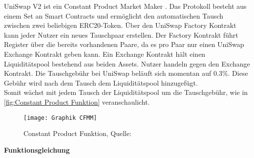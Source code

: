 \documentclass[12pt,a4paper,titlepage,oneside,english]{article}
\begin{document}
UniSwap V2 ist ein Constant Product Market Maker \citep{Berenzon2020}. Das Protokoll besteht aus einem Set an Smart Contracts und ermöglicht den automatischen Tausch zwischen zwei beliebigen ERC20-Token. %
Über den UniSwap Factory Kontrakt kann jeder Nutzer ein neues Tauschpaar erstellen. Der Factory Kontrakt führt Register über die bereits vorhandenen Paare, da es pro Paar nur einen UniSwap Exchange Kontrakt geben kann. Ein Exchange Kontrakt hält einen Liquiditätspool bestehend aus beiden Assets. Nutzer handeln gegen den Exchange Kontrakt.  
Die Tauschgebühr bei UniSwap beläuft sich momentan auf 0.3\%. Diese Gebühr wird nach dem Tausch dem Liquiditätspool hinzugefügt. \citep[vgl.][]{Adams2020} \\ 
Somit wächst mit jedem Tausch der Liquiditätspool um die Tauschgebühr, wie in \autoref{fig:Constant Product Funktion} veranschaulicht. \\

\begin{figure}[h!]
\begin{center}
\texttt{[image: Graphik CFMM]}
\caption{Constant Product Funktion, Quelle: \citet[S.10]{Schaer2020}}\label{fig:Constant Product Funktion}
\end{center}
\end{figure}

\textbf{Funktionsgleichung}
\end{document}
